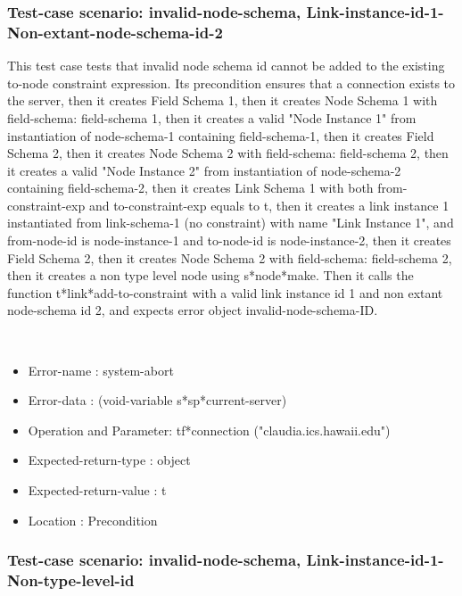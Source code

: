 \subsubsection {Test-case scenario: invalid-node-schema, Link-instance-id-1-Non-extant-node-schema-id-2}


This test case tests that invalid node schema id cannot be added to the existing to-node constraint expression.
Its precondition ensures that a connection exists to the server, then it creates Field Schema 1, then it creates Node Schema 1 with field-schema: field-schema 1, then it creates a valid "Node Instance 1" from instantiation of node-schema-1 containing field-schema-1, then it creates Field Schema 2, then it creates Node Schema 2 with field-schema: field-schema 2, then it creates a valid "Node Instance 2" from instantiation of node-schema-2 containing field-schema-2, then it creates Link Schema 1 with both from-constraint-exp and to-constraint-exp equals to t, then it creates a link instance 1 instantiated from  link-schema-1 (no constraint) with name "Link Instance 1", and from-node-id is node-instance-1 and to-node-id is node-instance-2, then it creates Field Schema 2, then it creates Node Schema 2 with field-schema: field-schema 2, then it creates a non type level node using s*node*make.
Then it calls the function t*link*add-to-constraint  with a valid link instance id 1 and non extant node-schema id 2, and expects error object invalid-node-schema-ID.



\
\begin {itemize}
\item 	Error-name             : system-abort
\item Error-data             : (void-variable s*sp*current-server)
\item Operation and Parameter: tf*connection ("claudia.ics.hawaii.edu")
\item Expected-return-type   : object
\item Expected-return-value  : t
\item Location               : Precondition



\end {itemize}
\subsubsection {Test-case scenario: invalid-node-schema, Link-instance-id-1-Non-type-level-id}



